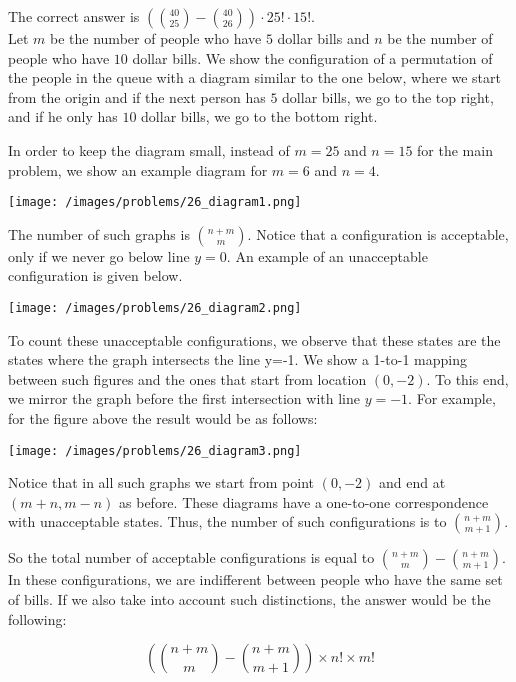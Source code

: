 \begin{solution}
The correct answer is $
(\binom{40 }{25} - \binom{40}{26}) \cdot 25! \cdot 15!$.\\[0.2cm]

Let $m$ be the number of people who have $5$ dollar bills and $n$ be the number of people who have $10$ dollar bills.
We show the configuration of a permutation of the people in the queue with a diagram similar to the one below, where we start from the origin and if the next person has $5$ dollar bills, we go to the top right, and if he only has $10$ dollar bills, we go to the bottom right.

In order to keep the diagram small, instead of $m=25$ and $n=15$ for the main problem,  we show an example diagram for  $m=6$ and $n=4$. 

\begin{center}
	\texttt{[image: /images/problems/26\_diagram1.png]}
\end{center}

The number of such graphs is ${n+m \choose m}$. Notice that a configuration is acceptable, only if we never go below line $y=0$. An example of an unacceptable configuration is given below.

\begin{center}
	\texttt{[image: /images/problems/26\_diagram2.png]}
\end{center}

To count these unacceptable configurations, we observe that these states are the states where the graph intersects the line y=-1. We show a 1-to-1 mapping between such figures and the ones that start from location $(0,-2)$. To this end, we mirror the graph before the first intersection with line $y=-1$. For example, for the figure above the result would be as follows:

\begin{center}
	\texttt{[image: /images/problems/26\_diagram3.png]}
\end{center}

Notice that in all such graphs we start from point $(0,-2)$ and end at $(m+n, m-n)$ as before. These diagrams have a one-to-one correspondence with unacceptable states. Thus, the number of such configurations is to ${n+m \choose m+1}$.

So the total number of acceptable configurations is equal to ${n+m \choose m} - {n+m \choose m+1}$. In these configurations, we are indifferent between people who have the same set of bills.
If we also take into account such distinctions, the answer would be the following:

$$
({n+m \choose m} - {n+m \choose m+1}) \times n! \times m!
$$




\end{solution}